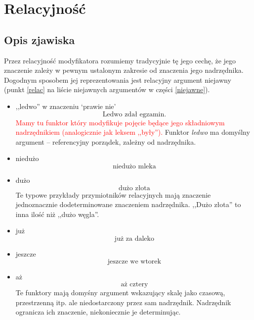 \documentclass[a4paper, 12pt]{article}
\theoremstyle{remark}
\begin{document}
\section{Relacyjność}
{
\renewcommand\thesection{}
\renewcommand\thesubsection{}
\setcounter{subsection}{-1}
\subsection{Opis zjawiska} %
\label{sub:opis_zjawiska1}
}

Przez relacyjność modyfikatora rozumiemy tradycyjnie tę jego cechę, że jego znaczenie zależy w pewnym ustalonym zakresie od znaczenia jego nadrzędnika. Dogodnym sposobem jej reprezentowania jest relacyjny argument niejawny (punkt \ref{relac} na liście niejawnych argumentów w części \ref{niejawne}).

\begin{itemize}
\item ,,ledwo'' w znaczeniu `prawie nie'
\begin{equation}
	\text{Ledwo zdał egzamin}.
\end{equation}
\textcolor{red}{Mamy tu funktor który modyfikuje pojęcie będące jego składniowym nadrzędnikiem (analogicznie jak leksem ,,były'').}
Funktor \emph{ledwo} ma domyślny argument -- referencyjny porządek, zależny od nadrzędnika.
\item niedużo
\begin{equation}
	\text{niedużo mleka}
\end{equation}
\item dużo
\begin{equation}
	\text{dużo złota}
\end{equation}
Te typowe przykłady przymiotników relacyjnych mają znaczenie jednoznacznie dodeterminowane znaczeniem nadrzędnika. 
,,Dużo złota'' to inna ilość niż ,,dużo węgla''.
\item już
\begin{equation}
	\text{już za daleko}
\end{equation}
\item jeszcze
\begin{equation}
	\text{jeszcze we wtorek}
\end{equation}
\item aż
\begin{equation}
	\text{aż cztery}
\end{equation}
Te funktory mają domyśny argument wskazujący skalę jako czasową, przestrzenną itp. ale niedostarczony przez sam nadrzędnik.
Nadrzędnik ogranicza ich znaczenie, niekoniecznie je determinując. 
\color{red}{(Ew. skala jest jednoznacznie przypisana do znaczenia leksemu
a ich wielość wynika z wielości znaczeń leksemu)
}
\end{itemize}
\end{document}

